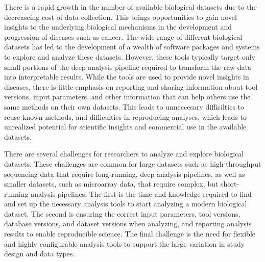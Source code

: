 There is a rapid growth in the number of available biological datasets due to
the decreaseing cost of data collection. This brings opportunities to gain
novel insights to the underlying biological mechanisms in the development and
progression of diseases such as cancer.  
The wide range of different biological
datasets has led to the development of a wealth of software packages and systems
to explore and analyze these datasets.  
However, these tools typically target
only small portions of the deep analysis pipeline required to transform the raw
data into interpretable results. While the tools are used to provide novel
insights in diseases, 
there is little emphasis on reporting and sharing
information about tool versions, input parameters, and other information that
can help others use the same methods on their own datasets. 
This leads to
unneccesary difficilties to reuse known methods, and difficulties in reproducing
analyses, which leads to 
unrealized potential for scientific insights and
commercial use in the available datasets. 

There are several challenges for researchers to analyze and explore biological
datasets. These challenges are common for large datasets such as high-throughput
sequencing data that require long-running, deep analysis pipelines, as well as
smaller datasets, such as microarray data, that require complex, but
short-running analysis pipelines.  The first is the time and knowledge required
to find and set up the necessary analysis tools to start analyzing a modern
biological dataset.  The second is ensuring the correct input parameters, tool
versions, database versions, and dataset versions when analyzing, and reporting
analysis results to enable reproducible science. The final challenge is the need
for flexible and highly configurable analysis tools to support the large
variation in study design and data types.

